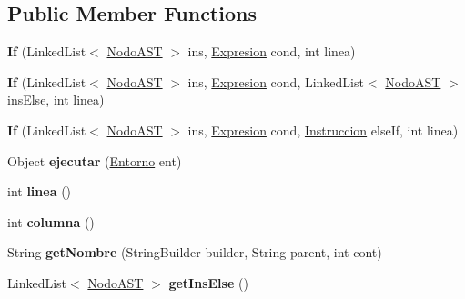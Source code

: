 \subsection*{Public Member Functions}
\begin{DoxyCompactItemize}
\item 
\mbox{\label{classast_1_1instrucciones_1_1_if_a0f89e733a56b9787330354e01f3bafe0}} 
{\bfseries If} (Linked\+List$<$ \mbox{\hyperlink{interfaceast_1_1_nodo_a_s_t}{Nodo\+A\+ST}} $>$ ins, \mbox{\hyperlink{interfaceast_1_1_expresion}{Expresion}} cond, int linea)
\item 
\mbox{\label{classast_1_1instrucciones_1_1_if_abc8fbc61b74acdd8cfab0a57d910543b}} 
{\bfseries If} (Linked\+List$<$ \mbox{\hyperlink{interfaceast_1_1_nodo_a_s_t}{Nodo\+A\+ST}} $>$ ins, \mbox{\hyperlink{interfaceast_1_1_expresion}{Expresion}} cond, Linked\+List$<$ \mbox{\hyperlink{interfaceast_1_1_nodo_a_s_t}{Nodo\+A\+ST}} $>$ins\+Else, int linea)
\item 
\mbox{\label{classast_1_1instrucciones_1_1_if_a4e64435ce4409ec289516aca9395481e}} 
{\bfseries If} (Linked\+List$<$ \mbox{\hyperlink{interfaceast_1_1_nodo_a_s_t}{Nodo\+A\+ST}} $>$ ins, \mbox{\hyperlink{interfaceast_1_1_expresion}{Expresion}} cond, \mbox{\hyperlink{interfaceast_1_1_instruccion}{Instruccion}} else\+If, int linea)
\item 
\mbox{\label{classast_1_1instrucciones_1_1_if_ad3e7a5d5eb42a040eac6bbee48fd5787}} 
Object {\bfseries ejecutar} (\mbox{\hyperlink{classentorno_1_1_entorno}{Entorno}} ent)
\item 
\mbox{\label{classast_1_1instrucciones_1_1_if_a63270d2ecde32b73162cafc6a3075fc3}} 
int {\bfseries linea} ()
\item 
\mbox{\label{classast_1_1instrucciones_1_1_if_aa08a9dcc80ca866b10209f792ddd7bc1}} 
int {\bfseries columna} ()
\item 
\mbox{\label{classast_1_1instrucciones_1_1_if_aa80fea499762ab1ec22628d43f04a0c8}} 
String {\bfseries get\+Nombre} (String\+Builder builder, String parent, int cont)
\item 
\mbox{\label{classast_1_1instrucciones_1_1_if_a0ecf379dfcb3bbed21c509237b27e084}} 
Linked\+List$<$ \mbox{\hyperlink{interfaceast_1_1_nodo_a_s_t}{Nodo\+A\+ST}} $>$ {\bfseries get\+Ins\+Else} ()
\end{DoxyCompactItemize}


